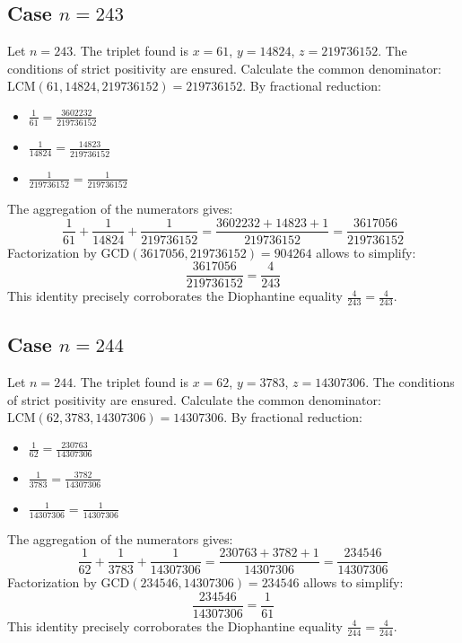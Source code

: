 \documentclass[11pt,a4paper]{article}
\begin{document}
\subsection{Case $n = 243$}
Let $n = 243$. The triplet found is $x = 61$, $y = 14824$, $z = 219736152$.
The conditions of strict positivity are ensured.
Calculate the common denominator: $\text{LCM}(61, 14824, 219736152) = 219736152$.
By fractional reduction:
\begin{itemize}
    \item $\frac{1}{61} = \frac{3602232}{219736152}$
    \item $\frac{1}{14824} = \frac{14823}{219736152}$
    \item $\frac{1}{219736152} = \frac{1}{219736152}$
\end{itemize}
The aggregation of the numerators gives:
$$ \frac{1}{61} + \frac{1}{14824} + \frac{1}{219736152} = \frac{3602232 + 14823 + 1}{219736152} = \frac{3617056}{219736152} $$
Factorization by $\text{GCD}(3617056, 219736152) = 904264$ allows to simplify:
$$ \frac{3617056}{219736152} = \frac{4}{243} $$
This identity precisely corroborates the Diophantine equality $\frac{4}{243} = \frac{4}{243}$.

\subsection{Case $n = 244$}
Let $n = 244$. The triplet found is $x = 62$, $y = 3783$, $z = 14307306$.
The conditions of strict positivity are ensured.
Calculate the common denominator: $\text{LCM}(62, 3783, 14307306) = 14307306$.
By fractional reduction:
\begin{itemize}
    \item $\frac{1}{62} = \frac{230763}{14307306}$
    \item $\frac{1}{3783} = \frac{3782}{14307306}$
    \item $\frac{1}{14307306} = \frac{1}{14307306}$
\end{itemize}
The aggregation of the numerators gives:
$$ \frac{1}{62} + \frac{1}{3783} + \frac{1}{14307306} = \frac{230763 + 3782 + 1}{14307306} = \frac{234546}{14307306} $$
Factorization by $\text{GCD}(234546, 14307306) = 234546$ allows to simplify:
$$ \frac{234546}{14307306} = \frac{1}{61} $$
This identity precisely corroborates the Diophantine equality $\frac{4}{244} = \frac{4}{244}$.
\end{document}
